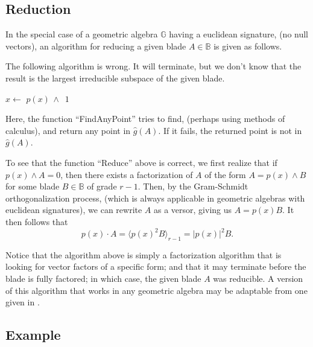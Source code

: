 \documentclass{birkjour}
\theoremstyle{definition}
\theoremstyle{remark}
\numberwithin{equation}{section}
\newcommand{\B}{\mathbb{B}}
\newcommand{\G}{\mathbb{G}}
\newcommand{\gh}{\hat{g}}
\begin{document}
\subsection{Reduction}

In the special case of a geometric algebra $\G$ having a euclidean signature, (no null vectors),
an algorithm for reducing a given blade $A\in\B$ is given as follows.

The following algorithm is wrong.  It will terminate, but we don't know that the result is
the largest irreducible subspace of the given blade.

\begin{algorithmic}
	\State $x\gets$
		\State\Return $p(x)\,\wedge\,$
	\EndIf
	\State\Return $1$
\EndFunction
\end{algorithmic}
Here, the function ``FindAnyPoint'' tries to find, (perhaps using methods of calculus), and return any point in $\gh(A)$.
If it fails, the returned point is not in $\gh(A)$.

To see that the function ``Reduce'' above is correct, we first realize that if $p(x)\wedge A=0$,
then there exists a factorization of $A$ of the form $A=p(x)\wedge B$ for some blade $B\in\B$
of grade $r-1$.
Then, by the Gram-Schmidt orthogonalization process, (which is always
applicable in geometric algebras with euclidean signatures), we can rewrite $A$ as a versor,
giving us $A=p(x)B$.  It then follows that
\begin{equation}
p(x)\cdot A = \langle p(x)^2 B\rangle_{r-1}=|p(x)|^2 B.
\end{equation}


Notice that the algorithm above is simply a factorization algorithm that is looking for
vector factors of a specific form; and that it may terminate before the blade is fully factored;
in which case, the given blade $A$ was reducible.  A version of this algorithm that works
in any geometric algebra may be adaptable from one given in \cite{Fontijne10}.

\subsection{Example}
\end{document}

